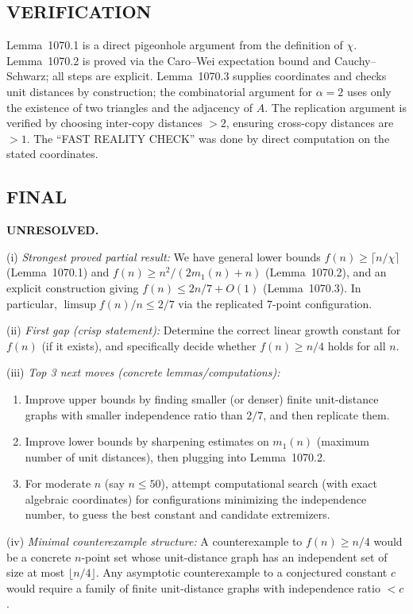\subsection*{VERIFICATION}
Lemma~1070.1 is a direct pigeonhole argument from the definition of $\chi$.
Lemma~1070.2 is proved via the Caro--Wei expectation bound and Cauchy--Schwarz; all steps are explicit.
Lemma~1070.3 supplies coordinates and checks unit distances by construction; the combinatorial argument for $\alpha=2$ uses only the existence of two triangles and the adjacency of $A$.
The replication argument is verified by choosing inter-copy distances $>2$, ensuring cross-copy distances are $>1$.
The ``FAST REALITY CHECK'' was done by direct computation on the stated coordinates.

\subsection*{FINAL}
\textbf{UNRESOLVED.}

(i) \emph{Strongest proved partial result:}
We have general lower bounds $f(n)\ge \lceil n/\chi\rceil$ (Lemma~1070.1) and $f(n)\ge n^2/(2m_1(n)+n)$ (Lemma~1070.2), and an explicit construction giving $f(n)\le 2n/7+O(1)$ (Lemma~1070.3).  In particular, $\limsup f(n)/n\le 2/7$ via the replicated 7-point configuration.

(ii) \emph{First gap (crisp statement):}
Determine the correct linear growth constant for $f(n)$ (if it exists), and specifically decide whether $f(n)\ge n/4$ holds for all $n$.

(iii) \emph{Top 3 next moves (concrete lemmas/computations):}
\begin{enumerate}
\item Improve upper bounds by finding smaller (or denser) finite unit-distance graphs with smaller independence ratio than $2/7$, and then replicate them.
\item Improve lower bounds by sharpening estimates on $m_1(n)$ (maximum number of unit distances), then plugging into Lemma~1070.2.
\item For moderate $n$ (say $n\le 50$), attempt computational search (with exact algebraic coordinates) for configurations minimizing the independence number, to guess the best constant and candidate extremizers.
\end{enumerate}

(iv) \emph{Minimal counterexample structure:}
A counterexample to $f(n)\ge n/4$ would be a concrete $n$-point set whose unit-distance graph has an independent set of size at most $\lfloor n/4\rfloor$.  Any asymptotic counterexample to a conjectured constant $c$ would require a family of finite unit-distance graphs with independence ratio $<c$.



